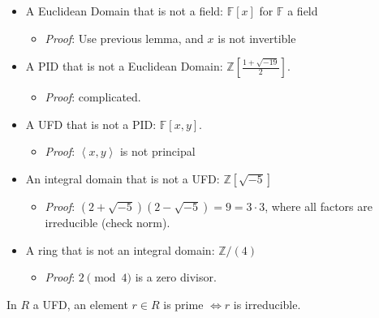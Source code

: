 \begin{example}

\begin{itemize}
\tightlist
\item
  A Euclidean Domain that is not a field: \({\mathbb{F}}[x]\) for
  \({\mathbb{F}}\) a field

  \begin{itemize}
  \tightlist
  \item
    \emph{Proof}: Use previous lemma, and \(x\) is not invertible
  \end{itemize}
\item
  A PID that is not a Euclidean Domain:
  \({\mathbb{Z}}\left[\frac{1 + \sqrt{-19}}{2}\right]\).

  \begin{itemize}
  \tightlist
  \item
    \emph{Proof}: complicated.
  \end{itemize}
\item
  A UFD that is not a PID: \({\mathbb{F}}[x, y]\).

  \begin{itemize}
  \tightlist
  \item
    \emph{Proof}: \(\left\langle{x, y}\right\rangle\) is not principal
  \end{itemize}
\item
  An integral domain that is not a UFD: \({\mathbb{Z}}[\sqrt{-5}]\)

  \begin{itemize}
  \tightlist
  \item
    \emph{Proof}: \((2+\sqrt{-5})(2-\sqrt{-5})=9=3\cdot 3\), where all
    factors are irreducible (check norm).
  \end{itemize}
\item
  A ring that is not an integral domain: \({\mathbb{Z}}/(4)\)

  \begin{itemize}
  \tightlist
  \item
    \emph{Proof}: \(2 \pmod 4\) is a zero divisor.
  \end{itemize}
\end{itemize}

\end{example}

\begin{proposition}

In \(R\) a UFD, an element \(r\in R\) is prime \(\iff r\) is
irreducible.

\end{proposition}

